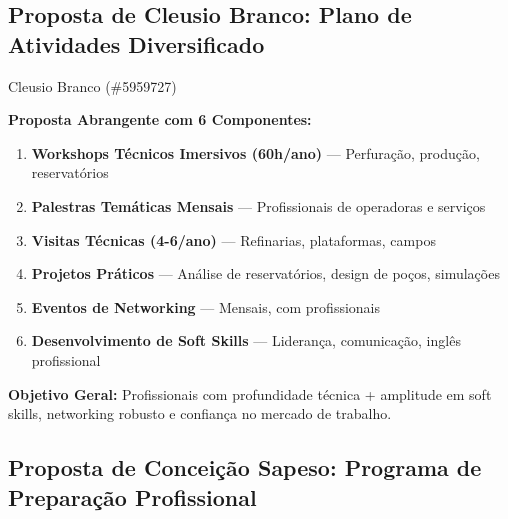 \documentclass[12pt,a4paper,oneside]{article}
\begin{document}
\vspace{1.2cm}

\subsection{Proposta de Cleusio Branco: Plano de Atividades Diversificado}

\begin{proposalbox}{Cleusio Branco (\#5959727)}

\textbf{Proposta Abrangente com 6 Componentes:}

\begin{enumerate}[label={\color{spe-secondary}\arabic*.}]
  \item \textbf{Workshops Técnicos Imersivos (60h/ano)} — Perfuração, produção, reservatórios
  \item \textbf{Palestras Temáticas Mensais} — Profissionais de operadoras e serviços
  \item \textbf{Visitas Técnicas (4-6/ano)} — Refinarias, plataformas, campos
  \item \textbf{Projetos Práticos} — Análise de reservatórios, design de poços, simulações
  \item \textbf{Eventos de Networking} — Mensais, com profissionais
  \item \textbf{Desenvolvimento de Soft Skills} — Liderança, comunicação, inglês profissional
\end{enumerate}

\textbf{Objetivo Geral:} Profissionais com profundidade técnica + amplitude em soft skills, networking robusto e confiança no mercado de trabalho.

\end{proposalbox}

\vspace{1.2cm}

\subsection{Proposta de Conceição Sapeso: Programa de Preparação Profissional}
\end{document}
